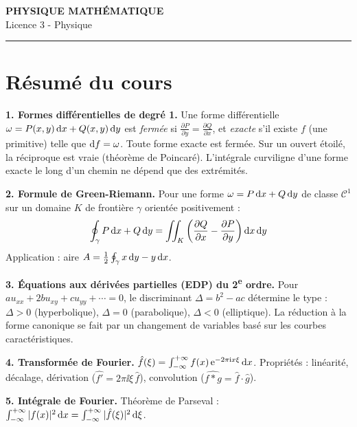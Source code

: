 \documentclass[12pt,a4paper]{article}
\begin{document}
\fi

\begin{center}
  {\LARGE\bfseries PHYSIQUE MATHÉMATIQUE}\\[0.3cm]
  {\normalsize Licence 3 - Physique}\\[0.1cm]
  \rule{0.7\textwidth}{0.8pt}
\end{center}

\section*{Résumé du cours}

\begin{boiteresume}

\textbf{1. Formes différentielles de degré 1.} Une forme différentielle $\omega = P(x,y)\,\mathrm{d} x + Q(x,y)\,\mathrm{d} y$ est \textit{fermée} si $\frac{\partial P}{\partial y} = \frac{\partial Q}{\partial x}$, et \textit{exacte} s'il existe $f$ (une primitive) telle que $\mathrm{d} f = \omega$. Toute forme exacte est fermée. Sur un ouvert étoilé, la réciproque est vraie (théorème de Poincaré). L'intégrale curviligne d'une forme exacte le long d'un chemin ne dépend que des extrémités.

\textbf{2. Formule de Green-Riemann.} Pour une forme $\omega = P\,\mathrm{d} x + Q\,\mathrm{d} y$ de classe $\mathcal{C}^1$ sur un domaine $K$ de frontière $\gamma$ orientée positivement :
\[
\oint_\gamma P\,\mathrm{d} x + Q\,\mathrm{d} y = \iint_K \left(\frac{\partial Q}{\partial x} - \frac{\partial P}{\partial y}\right)\mathrm{d} x\,\mathrm{d} y
\]
Application : aire $A = \frac{1}{2}\oint_\gamma x\,\mathrm{d} y - y\,\mathrm{d} x$.

\textbf{3. Équations aux dérivées partielles (EDP) du 2\textsuperscript{e} ordre.} Pour $au_{xx}+2bu_{xy}+cu_{yy}+\cdots=0$, le discriminant $\Delta = b^2 - ac$ détermine le type : $\Delta>0$ (hyperbolique), $\Delta=0$ (parabolique), $\Delta<0$ (elliptique). La réduction à la forme canonique se fait par un changement de variables basé sur les courbes caractéristiques.

\textbf{4. Transformée de Fourier.} $\hat{f}(\xi) = \int_{-\infty}^{+\infty} f(x)\,\mathrm{e}^{-2\pi\mathrm{i} x\xi}\,\mathrm{d} x$. Propriétés : linéarité, décalage, dérivation ($\widehat{f'} = 2\pi\ii\xi\,\hat{f}$), convolution ($\widehat{f*g} = \hat{f}\cdot\hat{g}$).

\textbf{5. Intégrale de Fourier.} Théorème de Parseval : $\int_{-\infty}^{+\infty}|f(x)|^2\,\mathrm{d} x = \int_{-\infty}^{+\infty}|\hat{f}(\xi)|^2\,\mathrm{d}\xi$.

\end{boiteresume}
\end{document}
